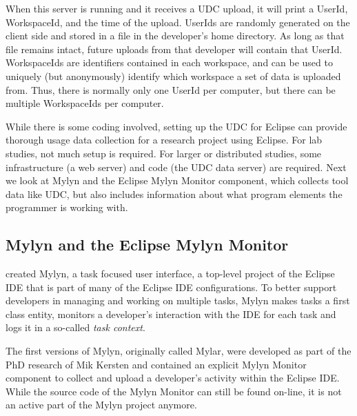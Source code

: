 \noindent
When this server is running and it receives a UDC upload,
it will print a UserId, WorkspaceId, and the time of the upload.
UserIds are randomly generated on the client side and stored in a file in
the developer's home directory.
As long as that file remains intact, future uploads from that developer will
contain that UserId.
WorkspaceIds are identifiers contained in each workspace, and can be
used to uniquely (but anonymously) identify which
workspace a set of data is uploaded from.
Thus, there is normally only one UserId per computer, but there can
be multiple WorkspaceIds per computer.

While there is some coding involved, setting up the UDC for Eclipse can provide thorough usage data collection for a research project using Eclipse.   For lab studies, not much setup is required.  For larger or distributed studies, some infrastructure (a web server) and code (the UDC data server) are required.  Next we look at Mylyn and the Eclipse Mylyn Monitor component, which collects tool data like UDC, but also includes information about what program elements
the programmer is working with.

\subsection{Mylyn and the Eclipse Mylyn Monitor}
\label{MylynMonitor}




 created Mylyn, a task focused user interface, a top-level project of the Eclipse IDE that is part of many of the Eclipse IDE configurations. To better support developers in managing and working on multiple tasks, Mylyn makes tasks a first class entity, monitors a developer's interaction with the IDE for each task and logs it in a so-called \textit{task context}.

The first versions of Mylyn, originally called Mylar, were developed as part of the PhD research of Mik Kersten and contained an explicit Mylyn Monitor component to collect and upload a developer's activity within the Eclipse IDE. While the source code of the Mylyn Monitor can still be found on-line, it is not an active part of the Mylyn project anymore.

